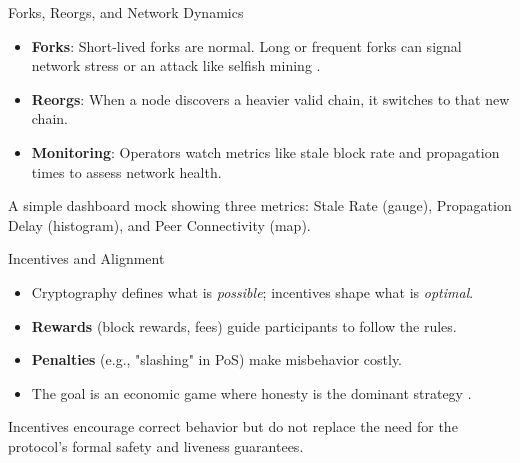 \documentclass[aspectratio=169]{beamer}
\newcommand{\placeholdergraphic}[2][\linewidth]{%
  \begin{tcolorbox}[
    enhanced, colback=white, colframe=usmagray,
    title=Graphic placeholder, width=#1, sharp corners,
    boxrule=0.5pt, left=4pt,right=4pt,top=6pt,bottom=6pt
  ]
    \footnotesize #2
  \end{tcolorbox}
}
\begin{document}
\begin{frame}{Forks, Reorgs, and Network Dynamics}
    \begin{itemize}
        \item \textbf{Forks}: Short-lived forks are normal. Long or frequent forks can signal network stress or an attack like selfish mining \cite{eyal_majority_2014}.
        \item \textbf{Reorgs}: When a node discovers a heavier valid chain, it switches to that new chain.
        \item \textbf{Monitoring}: Operators watch metrics like stale block rate and propagation times to assess network health.
    \end{itemize}
    \vfill
    \placeholdergraphic{A simple dashboard mock showing three metrics: Stale Rate (gauge), Propagation Delay (histogram), and Peer Connectivity (map).}
\end{frame}

\begin{frame}{Incentives and Alignment}
    \begin{itemize}
        \item Cryptography defines what is \textit{possible}; incentives shape what is \textit{optimal}.
        \item \textbf{Rewards} (block rewards, fees) guide participants to follow the rules.
        \item \textbf{Penalties} (e.g., "slashing" in PoS) make misbehavior costly.
        \item The goal is an economic game where honesty is the dominant strategy \cite{bano_blockchain_2017}.
    \end{itemize}
    \vfill
    \begin{tcolorbox}[enhanced, colback=red!20, colframe=red!75!black, fonttitle=\bfseries, title={Incentives Complement Guarantees}, rounded corners, drop shadow]
    \small Incentives encourage correct behavior but do not replace the need for the protocol's formal safety and liveness guarantees.
    \end{tcolorbox}
\end{frame}
\end{document}
